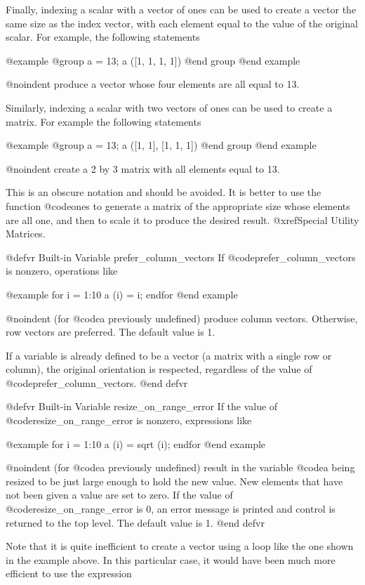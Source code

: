 Finally, indexing a scalar with a vector of ones can be used to create a
vector the same size as the index vector, with each element equal to
the value of the original scalar.  For example, the following statements

@example
@group
a = 13;
a ([1, 1, 1, 1])
@end group
@end example

@noindent
produce a vector whose four elements are all equal to 13.

Similarly, indexing a scalar with two vectors of ones can be used to
create a matrix.  For example the following statements

@example
@group
a = 13;
a ([1, 1], [1, 1, 1])
@end group
@end example

@noindent
create a 2 by 3 matrix with all elements equal to 13.

This is an obscure notation and should be avoided.  It is better to
use the function @code{ones} to generate a matrix of the appropriate
size whose elements are all one, and then to scale it to produce the
desired result.  @xref{Special Utility Matrices}.

@defvr {Built-in Variable} prefer_column_vectors
If @code{prefer_column_vectors} is nonzero, operations like

@example
for i = 1:10
  a (i) = i;
endfor
@end example

@noindent
(for @code{a} previously  undefined) produce column vectors.  Otherwise, row
vectors are preferred.  The default value is 1.

If a variable is already defined to be a vector (a matrix with a single
row or column), the original orientation is respected, regardless of the
value of @code{prefer_column_vectors}.
@end defvr

@defvr {Built-in Variable} resize_on_range_error
If the value of @code{resize_on_range_error} is nonzero, expressions
like

@example
for i = 1:10
  a (i) = sqrt (i);
endfor
@end example

@noindent
(for @code{a} previously undefined) result in the variable @code{a}
being resized to be just large enough to hold the new value.  New
elements that have not been given a value are set to zero.  If the value
of @code{resize_on_range_error} is 0, an error message is printed and
control is returned to the top level.  The default value is 1.
@end defvr

Note that it is quite inefficient to create a vector using a loop like
the one shown in the example above.  In this particular case, it would
have been much more efficient to use the expression

